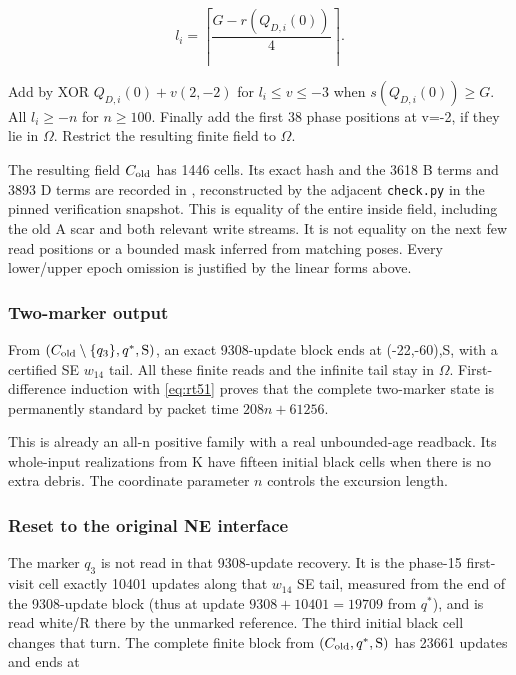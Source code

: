 \[
l_i=\left\lceil\frac{G-r(Q_{D,i}(0))}{4}\right\rceil.
\]

Add by XOR $Q_{D,i}(0)+v(2,-2)$ for $l_i\le v\le-3$ when
$s(Q_{D,i}(0))\ge G$. All $l_i\ge-n$ for
$n\ge100$. Finally add the first 38 phase positions at v=-2, if
they lie in $\Omega$. Restrict the resulting finite field to $\Omega$.

The resulting field $C_{\rm old}$ has 1446 cells. Its exact hash and the 3618 B
terms and 3893 D terms are recorded in
,
reconstructed by the adjacent \texttt{check.py} in the pinned verification snapshot. This is equality of
the entire inside field, including the old A scar and both relevant
write streams. It is not equality on the next few read positions or a
bounded mask inferred from matching poses. Every lower/upper epoch
omission is justified by the linear forms above.

\subsubsection{Two-marker output}\label{two-marker-output}

From $(C_{\rm old}\setminus\{q_3\},q^*,\mathrm S)$, an exact 9308-update block ends at
(-22,-60),S, with a certified SE $w_{14}$ tail. All these finite reads and
the infinite tail stay in $\Omega$. First-difference induction with \eqref{eq:rt51}
proves that the complete two-marker state is permanently standard by
packet time $208n+61256$.

This is already an all-n positive family with a real unbounded-age
readback. Its whole-input realizations from K have fifteen initial black
cells when there is no extra debris. The coordinate parameter $n$ controls the excursion length.

\subsubsection{Reset to the original NE
interface}\label{reset-to-the-original-ne-interface}

The marker $q_3$ is not read in that 9308-update recovery. It is the
phase-15 first-visit cell exactly 10401 updates along that $w_{14}$ SE tail, measured from the end of the 9308-update block
(thus at update $9308+10401=19709$ from $q^*$),
and is read white/R there by the unmarked reference. The third initial
black cell changes that turn. The complete finite block from
$(C_{\rm old},q^*,\mathrm S)$ has 23661 updates and ends at


